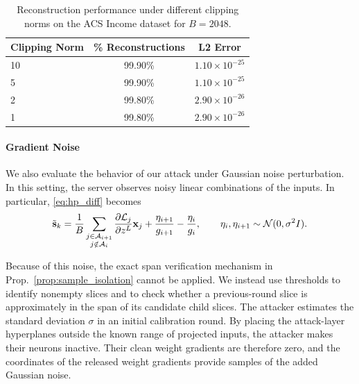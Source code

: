 \begin{table}[t]
\centering
\caption{Reconstruction performance under different clipping norms on the ACS Income dataset for $B=2048$.}

\begin{tabular}{lcc}
\toprule
Clipping Norm & \% Reconstructions & L2 Error \\
\midrule
10 & 99.90\% & $1.10 \times 10^{-25}$ \\
5  & 99.90\% & $1.10 \times 10^{-25}$ \\
2  & 99.80\% & $2.90 \times 10^{-26}$ \\
1  & 99.80\% & $2.90 \times 10^{-26}$ \\
\bottomrule
\end{tabular}
\label{tab:clipping}
\end{table}



\paragraph{Gradient Noise}
We also evaluate the behavior of our attack under Gaussian noise
perturbation. In this setting, the server observes noisy linear combinations
of the inputs. In particular, \eqref{eq:hp_diff} becomes
\begin{equation}
    \tilde{\mathbf{s}}_k =
    \frac{1}{B}
    \sum_{\substack{j \in \mathcal{A}_{i+1} \\ j \notin \mathcal{A}_i}}
    \frac{\partial \mathcal{L}_j}{\partial z^L}{\mathbf{x}}_j
    + \frac{\eta_{i+1}}{g_{i+1}}-\frac{\eta_i}{g_i},
    \qquad
    \eta_i,\eta_{i+1}\sim\mathcal{N}(0,\sigma^2 I).
\end{equation}

Because of this noise, the exact span verification mechanism in
Prop.~\ref{prop:sample_isolation} cannot be applied. We instead use
thresholds to identify nonempty slices and to check whether a
previous-round slice is approximately in the span of its candidate
child slices. The attacker estimates the standard deviation $\sigma$ in
an initial calibration round. By placing the attack-layer hyperplanes
outside the known range of projected inputs, the attacker makes their
neurons inactive. Their clean weight gradients are therefore zero, and
the coordinates of the released weight gradients provide samples of
the added Gaussian noise.

